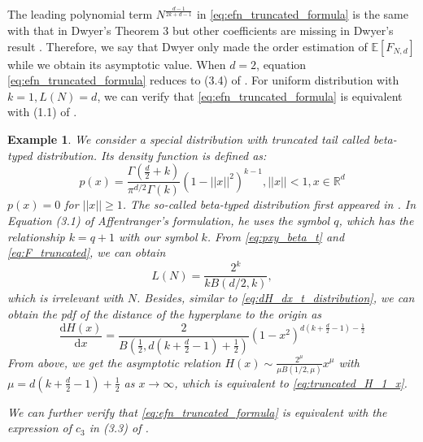 \documentclass[conference,a4paper]{IEEEtran}
\def\E{\mathbb{E}}
\def\dd{\mathrm{d}}
\newtheorem{example}{Example}
\begin{document}
 The leading polynomial term $N^{\frac{d-1}{2k+d-1}}$ in \eqref{eq:efn_truncated_formula}
 is the same with that in Dwyer's Theorem 3
 but other coefficients are missing in Dwyer's result
 \cite{dwyer1991convex}. Therefore, we say that Dwyer only made the order estimation
 of $\E[F_{N,d}]$ while we obtain its asymptotic value.
 When $d=2$, equation \eqref{eq:efn_truncated_formula} reduces to (3.4) of \cite{carnal1970konvexe}.
 For uniform distribution with $k=1, L(N)=d$, we can verify that
 \eqref{eq:efn_truncated_formula} is equivalent with (1.1)
 of \cite{raynaud1970enveloppe}.
 \begin{example}\label{ex:beta_typed}
  We consider a special distribution with truncated tail called
  beta-typed distribution. Its density function is defined as:
  \begin{equation}\label{eq:pxy_beta_t}
    p(x) = \frac{\Gamma(\frac{d}{2}+ k)}{\pi^{d/2} \Gamma(k)} (1-||x||^2)^{k-1},
    ||x|| <1, x \in \mathbb{R}^d
\end{equation}
 $p(x)=0$ for $||x||\geq 1$.
 The so-called beta-typed distribution first appeared in \cite{affentranger1991convex}.
 In Equation (3.1) of Affentranger's formulation,
 he uses the symbol $q$, which has the relationship  $k=q+1$ with our symbol $k$.
 From \eqref{eq:pxy_beta_t} and \eqref{eq:F_truncated}, we can obtain
 \begin{equation}\label{eq:beta_typed_L_N}
  L(N)=\frac{2^k}{kB(d/2,k)},
 \end{equation}
 which is irrelevant with $N$.
 Besides, similar to \eqref{eq:dH_dx_t_distribution},
 we can obtain the pdf of the distance of the hyperplane to the origin as
\begin{equation}
     \frac{\dd H(x)}{\dd x} = \frac{2}{B(\frac{1}{2}, d(k+\frac{d}{2}-1)+\frac{1}{2})}\left(1 -x^2\right)^{d(k+\frac{d}{2}-1)-\frac{1}{2}} 
\end{equation}
From above, we get the asymptotic relation $H(x) \sim \frac{2^{\mu}}{\mu B(1/2, \mu)}
x^{\mu}$ with $\mu=d(k+\frac{d}{2}-1)+\frac{1}{2}$ as $x\to \infty$,
which is equivalent to \eqref{eq:truncated_H_1_x}.

 We can further verify that
 \eqref{eq:efn_truncated_formula} is equivalent with the expression of $c_3$
 in (3.3) of \cite{affentranger1991convex}.
 \end{example}
\end{document}
